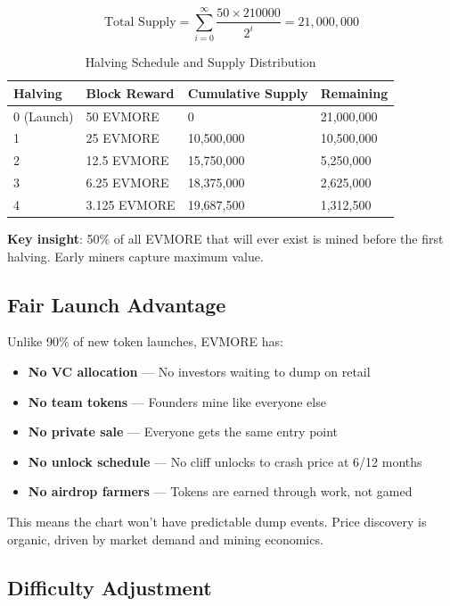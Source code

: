 \documentclass[11pt,a4paper]{article}
\begin{document}
\begin{equation}
\text{Total Supply} = \sum_{i=0}^{\infty} \frac{50 \times 210000}{2^i} = 21,000,000
\end{equation}

\begin{table}[h]
\centering
\begin{tabular}{@{}llll@{}}
\toprule
\textbf{Halving} & \textbf{Block Reward} & \textbf{Cumulative Supply} & \textbf{Remaining} \\
\midrule
0 (Launch) & 50 EVMORE & 0 & 21,000,000 \\
1 & 25 EVMORE & 10,500,000 & 10,500,000 \\
2 & 12.5 EVMORE & 15,750,000 & 5,250,000 \\
3 & 6.25 EVMORE & 18,375,000 & 2,625,000 \\
4 & 3.125 EVMORE & 19,687,500 & 1,312,500 \\
\bottomrule
\end{tabular}
\caption{Halving Schedule and Supply Distribution}
\end{table}

\noindent \textbf{Key insight}: 50\% of all EVMORE that will ever exist is mined before the first halving. Early miners capture maximum value.

\subsection{Fair Launch Advantage}

Unlike 90\% of new token launches, EVMORE has:

\begin{itemize}
    \item \textbf{No VC allocation} --- No investors waiting to dump on retail
    \item \textbf{No team tokens} --- Founders mine like everyone else
    \item \textbf{No private sale} --- Everyone gets the same entry point
    \item \textbf{No unlock schedule} --- No cliff unlocks to crash price at 6/12 months
    \item \textbf{No airdrop farmers} --- Tokens are earned through work, not gamed
\end{itemize}

\noindent This means the chart won't have predictable dump events. Price discovery is organic, driven by market demand and mining economics.

\subsection{Difficulty Adjustment}
\end{document}
